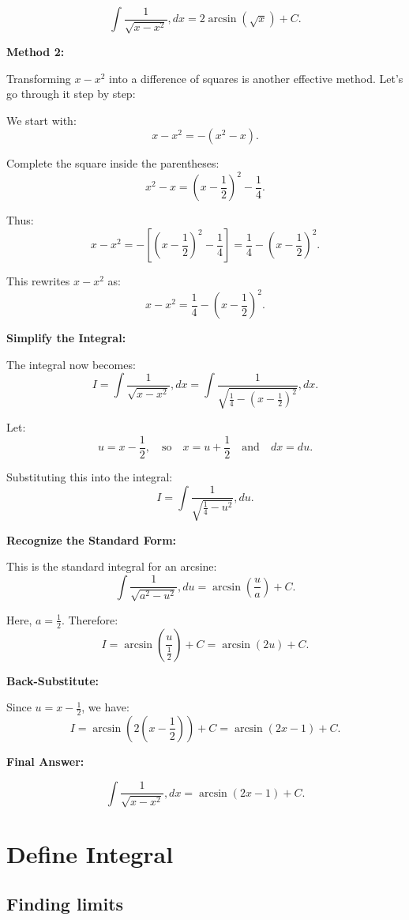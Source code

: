 \documentclass[a4paper,12pt]{book}
\begin{document}
\[
\int \frac{1}{\sqrt{x - x^2}} , dx = 2\arcsin(\sqrt{x}) + C.
\]

\textbf{Method 2:}

Transforming \( x - x^2 \) into a difference of squares is another effective method. Let’s go through it step by step:

We start with:
\[
x - x^2 = -\left(x^2 - x\right).
\]

Complete the square inside the parentheses:
\[
x^2 - x = \left(x - \frac{1}{2}\right)^2 - \frac{1}{4}.
\]

Thus:
\[
x - x^2 = -\left[\left(x - \frac{1}{2}\right)^2 - \frac{1}{4}\right] = \frac{1}{4} - \left(x - \frac{1}{2}\right)^2.
\]

This rewrites \( x - x^2 \) as:
\[
x - x^2 = \frac{1}{4} - \left(x - \frac{1}{2}\right)^2.
\]

\textbf{Simplify the Integral:}

The integral now becomes:
\[
I = \int \frac{1}{\sqrt{x - x^2}} , dx = \int \frac{1}{\sqrt{\frac{1}{4} - \left(x - \frac{1}{2}\right)^2}} , dx.
\]

Let:
\[
u = x - \frac{1}{2}, \quad \text{so} \quad x = u + \frac{1}{2} \quad \text{and} \quad dx = du.
\]

Substituting this into the integral:
\[
I = \int \frac{1}{\sqrt{\frac{1}{4} - u^2}} , du.
\]

\textbf{Recognize the Standard Form:}

This is the standard integral for an arcsine:
\[
\int \frac{1}{\sqrt{a^2 - u^2}} , du = \arcsin\left(\frac{u}{a}\right) + C.
\]

Here, \( a = \frac{1}{2} \). Therefore:
\[
I = \arcsin\left(\frac{u}{\frac{1}{2}}\right) + C = \arcsin(2u) + C.
\]

\textbf{Back-Substitute:}

Since \( u = x - \frac{1}{2} \), we have:
\[
I = \arcsin\left(2\left(x - \frac{1}{2}\right)\right) + C = \arcsin(2x - 1) + C.
\]

\textbf{Final Answer:}

\[
\int \frac{1}{\sqrt{x - x^2}} , dx = \arcsin(2x - 1) + C.
\]

\chapter{Define Integral}

\section{Finding limits}
\end{document}

